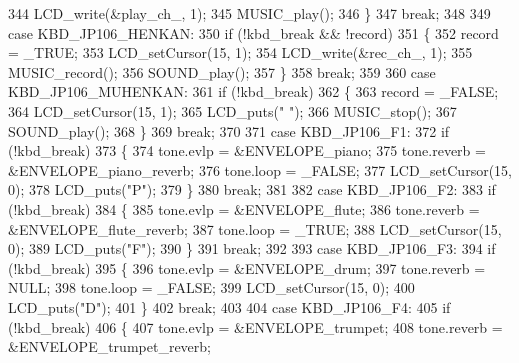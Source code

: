 \begin{DoxyCode}
{344                 LCD\_write(&play\_ch\_, 1);
345                 MUSIC\_play();
346             \}
347             \textcolor{keywordflow}{break};
348 
349         \textcolor{keywordflow}{case} KBD\_JP106\_HENKAN:
350             \textcolor{keywordflow}{if} (!kbd\_break && !record)
351             \{
352                 record = \_TRUE;
353                 LCD\_setCursor(15, 1);
354                 LCD\_write(&rec\_ch\_, 1);
355                 MUSIC\_record();
356                 SOUND\_play();
357             \}
358             \textcolor{keywordflow}{break};
359 
360         \textcolor{keywordflow}{case} KBD\_JP106\_MUHENKAN:
361             \textcolor{keywordflow}{if} (!kbd\_break)
362             \{
363                 record = \_FALSE;
364                 LCD\_setCursor(15, 1);
365                 LCD\_puts(\textcolor{stringliteral}{" "});
366                 MUSIC\_stop();
367                 SOUND\_play();
368             \}
369             \textcolor{keywordflow}{break};
370 
371         \textcolor{keywordflow}{case} KBD\_JP106\_F1:
372             \textcolor{keywordflow}{if} (!kbd\_break)
373             \{
374                 tone.evlp = &ENVELOPE\_piano;
375                 tone.reverb = &ENVELOPE\_piano\_reverb;
376                 tone.loop = \_FALSE;
377                 LCD\_setCursor(15, 0);
378                 LCD\_puts(\textcolor{stringliteral}{"P"});
379             \}
380             \textcolor{keywordflow}{break};
381 
382         \textcolor{keywordflow}{case} KBD\_JP106\_F2:
383             \textcolor{keywordflow}{if} (!kbd\_break)
384             \{
385                 tone.evlp = &ENVELOPE\_flute;
386                 tone.reverb = &ENVELOPE\_flute\_reverb;
387                 tone.loop = \_TRUE;
388                 LCD\_setCursor(15, 0);
389                 LCD\_puts(\textcolor{stringliteral}{"F"});
390             \}
391             \textcolor{keywordflow}{break};
392 
393         \textcolor{keywordflow}{case} KBD\_JP106\_F3:
394             \textcolor{keywordflow}{if} (!kbd\_break)
395             \{
396                 tone.evlp = &ENVELOPE\_drum;
397                 tone.reverb = NULL;
398                 tone.loop = \_FALSE;
399                 LCD\_setCursor(15, 0);
400                 LCD\_puts(\textcolor{stringliteral}{"D"});
401             \}
402             \textcolor{keywordflow}{break};
403 
404         \textcolor{keywordflow}{case} KBD\_JP106\_F4:
405             \textcolor{keywordflow}{if} (!kbd\_break)
406             \{
407                 tone.evlp = &ENVELOPE\_trumpet;
408                 tone.reverb = &ENVELOPE\_trumpet\_reverb;
}
\end{DoxyCode}

